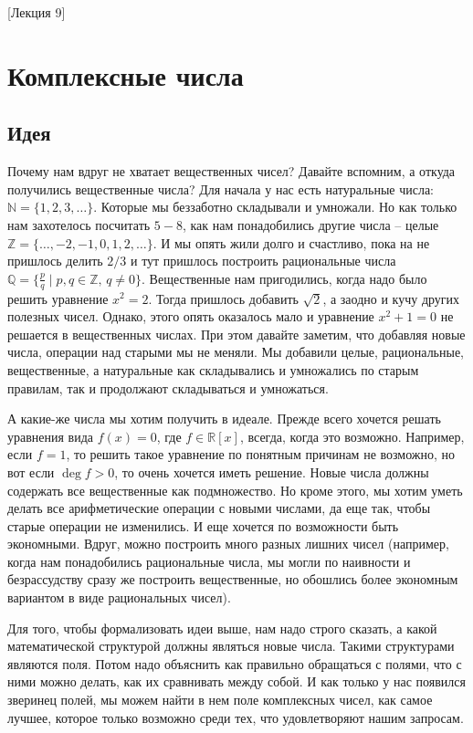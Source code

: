 [Лекция 9]



\newpage
\section{Комплексные числа}

\subsection{Идея}
Почему нам вдруг не хватает вещественных чисел? Давайте вспомним, а откуда получились вещественные числа? Для начала у нас есть натуральные числа: $\mathbb N = \{1,2,3,\ldots\}$. Которые мы беззаботно складывали и умножали. Но как только нам захотелось посчитать $5 - 8$, как нам понадобились другие числа -- целые $\mathbb Z = \{\ldots, -2, -1,0,1,2,\ldots\}$. И мы опять жили долго и счастливо, пока на не пришлось делить $2/3$ и тут пришлось построить рациональные числа $\mathbb Q = \{\frac{p}{q}\mid p,q\in \mathbb Z,\, q\neq 0\}$. Вещественные нам пригодились, когда надо было решить уравнение $x^2 = 2$. Тогда пришлось добавить $\sqrt{2}$, а заодно и кучу других полезных чисел. Однако, этого опять оказалось мало и уравнение $x^2 +1 = 0$ не решается в вещественных числах. При этом давайте заметим, что добавляя новые числа, операции над старыми мы не меняли. Мы добавили целые, рациональные, вещественные, а натуральные как складывались и умножались по старым правилам, так и продолжают складываться и умножаться.

А какие-же числа мы хотим получить в идеале. Прежде всего хочется решать уравнения вида $f(x) = 0$, где $f\in \mathbb R[x]$, всегда, когда это возможно. Например, если $f = 1$, то решить такое уравнение по понятным причинам не возможно, но вот если $\deg f > 0$, то очень хочется иметь решение. Новые числа должны содержать все вещественные как подмножество. Но кроме этого, мы хотим уметь делать все арифметические операции с новыми числами, да еще так, чтобы старые операции не изменились. И еще хочется по возможности быть экономными. Вдруг, можно построить много разных лишних чисел (например, когда нам понадобились рациональные числа, мы могли по наивности и безрассудству сразу же построить вещественные, но обошлись более экономным вариантом в виде рациональных чисел). 

Для того, чтобы формализовать идеи выше, нам надо строго сказать, а какой математической структурой должны являться новые числа. Такими структурами являются поля. Потом надо объяснить как правильно обращаться с полями, что с ними можно делать, как их сравнивать между собой. И как только у нас появился зверинец полей, мы можем найти в нем поле комплексных чисел, как самое лучшее, которое только возможно среди тех, что удовлетворяют нашим запросам.



